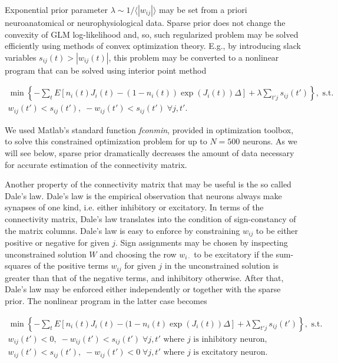 Exponential prior parameter $\lambda\sim 1/\langle|w_{ij}|\rangle$ may be set from a priori neuroanatomical or neurophysiological data. Sparse prior does not change the convexity of GLM log-likelihood and, so, such regularized problem may be solved efficiently using methods of convex optimization theory. E.g., by introducing slack variables $s_{ij}(t)>|w_{ij}(t)|$, this problem may be converted to a nonlinear program that can be solved using interior point method

\begin{equation} \label{eqn:conconvexopt}
\begin{array}{l}
\min \left\{-\sum\limits_t E\left[ n_i(t) J_i(t) - (1-n_i(t)) \exp(J_i(t)) \Delta \right]+\lambda \sum\limits_{t'j}s_{ij}(t')\right\}, \text{ s.t. } 
\\ w_{ij}(t')<s_{ij}(t'), \; -w_{ij}(t')<s_{ij}(t') \; \forall j, t'.
\end{array} 
\end{equation}

We used Matlab's standard function {\em fconmin}, provided in optimization toolbox, to solve this constrained optimization problem for up to $N=500$ neurons. As we will see below, sparse prior dramatically decreases the amount of data necessary for accurate estimation of the connectivity matrix.

Another property of the connectivity matrix that may be useful is the so called Dale's law. Dale's law is the empirical observation that neurons always make synapses of one kind, i.e. either inhibitory or excitatory. In terms of the connectivity matrix, Dale's law translates into the condition of sign-constancy of the matrix columns. Dale's law is easy to enforce by constraining $w_{ij}$ to be either positive or negative for given $j$.  Sign assignments may be chosen by inspecting unconstrained solution $W$ and choosing the row $w_{i \cdot}$ to be excitatory if the sum-squares of the positive terms $w_{ij}$ for given $j$ in the unconstrained solution is greater than that of the negative terms, and inhibitory otherwise.  After that, Dale's law may be enforced either independently or together with the sparse prior.  The nonlinear program in the latter case becomes

\begin{equation}
\begin{array}{l}
\min \left\{-\sum\limits_t E\left[ n_i(t) J_i(t) - (1-n_i(t) \exp(J_i(t)) \Delta \right]+\lambda \sum\limits_{t'j}s_{ij}(t')\right\}, \text{ s.t. }\\
w_{ij}(t')<0, \; -w_{ij}(t')<s_{ij}(t') \; \forall j, t'\text{ where }j\text{ is inhibitory neuron}, \\
w_{ij}(t')<s_{ij}(t'), \; -w_{ij}(t')<0 \; \forall j, t'\text{ where }j\text{ is excitatory neuron}. \\
\end{array}
\end{equation}

